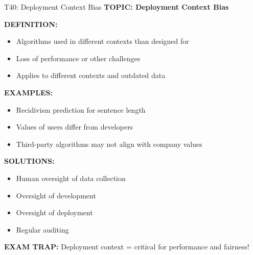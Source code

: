\documentclass[8pt]{beamer}
\begin{document}
	\begin{frame}{T40: Deployment Context Bias}
		\fontsize{6.5}{7.5}\selectfont
		\textbf{TOPIC: Deployment Context Bias}
		
		\vspace{0.1cm}
		\textbf{DEFINITION:}
		\begin{itemize}
			\item Algorithms used in different contexts than designed for
			\item Loss of performance or other challenges
			\item Applies to different contexts and outdated data
		\end{itemize}
		
		\vspace{0.1cm}
		\textbf{EXAMPLES:}
		\begin{itemize}
			\item Recidivism prediction for sentence length
			\item Values of users differ from developers
			\item Third-party algorithms may not align with company values
		\end{itemize}
		
		\vspace{0.1cm}
		\textbf{SOLUTIONS:}
		\begin{itemize}
			\item Human oversight of data collection
			\item Oversight of development
			\item Oversight of deployment
			\item Regular auditing
		\end{itemize}
		
		\textcolor{myred}{\textbf{EXAM TRAP:}} Deployment context = \textcolor{myblue}{critical for performance and fairness}!
	\end{frame}
	
\end{document}
